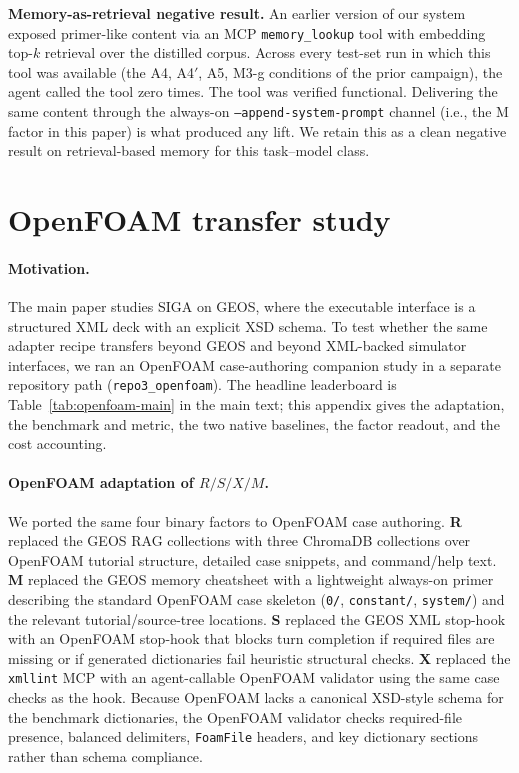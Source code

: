 \documentclass{article}
\begin{document}
\textbf{Memory-as-retrieval negative result.} An earlier version of our system exposed primer-like content via an MCP \texttt{memory\_lookup} tool with embedding top-$k$ retrieval over the distilled corpus. Across every test-set run in which this tool was available (the A4, A4$'$, A5, M3-g conditions of the prior campaign), the agent called the tool zero times. The tool was verified functional. Delivering the same content through the always-on \texttt{--append-system-prompt} channel (i.e., the M factor in this paper) is what produced any lift. We retain this as a clean negative result on retrieval-based memory for this task--model class.

\section{OpenFOAM transfer study}
\label{app:openfoam-transfer}

\paragraph{Motivation.}
The main paper studies SIGA on GEOS, where the executable interface is a structured XML deck with an explicit XSD schema. To test whether the same adapter recipe transfers beyond GEOS and beyond XML-backed simulator interfaces, we ran an OpenFOAM case-authoring companion study in a separate repository path (\texttt{repo3\_openfoam}). The headline leaderboard is Table~\ref{tab:openfoam-main} in the main text; this appendix gives the adaptation, the benchmark and metric, the two native baselines, the factor readout, and the cost accounting.

\paragraph{OpenFOAM adaptation of \texorpdfstring{$R/S/X/M$}{R/S/X/M}.}
We ported the same four binary factors to OpenFOAM case authoring. \textbf{R} replaced the GEOS RAG collections with three ChromaDB collections over OpenFOAM tutorial structure, detailed case snippets, and command/help text. \textbf{M} replaced the GEOS memory cheatsheet with a lightweight always-on primer describing the standard OpenFOAM case skeleton (\texttt{0/}, \texttt{constant/}, \texttt{system/}) and the relevant tutorial/source-tree locations. \textbf{S} replaced the GEOS XML stop-hook with an OpenFOAM stop-hook that blocks turn completion if required files are missing or if generated dictionaries fail heuristic structural checks. \textbf{X} replaced the \texttt{xmllint} MCP with an agent-callable OpenFOAM validator using the same case checks as the hook. Because OpenFOAM lacks a canonical XSD-style schema for the benchmark dictionaries, the OpenFOAM validator checks required-file presence, balanced delimiters, \texttt{FoamFile} headers, and key dictionary sections rather than schema compliance.
\end{document}
